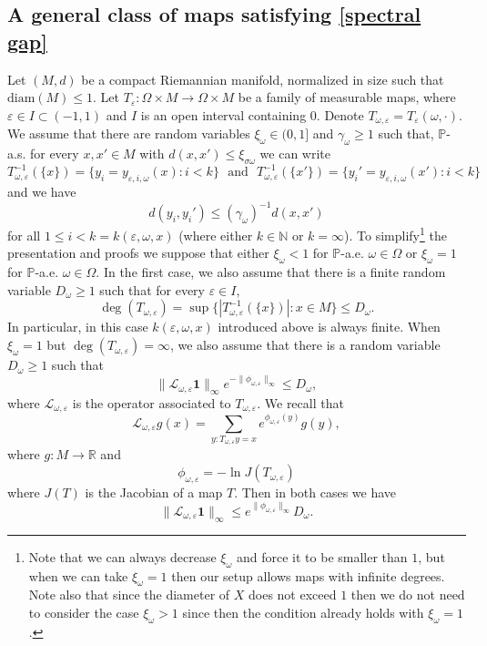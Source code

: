 \documentclass[11pt,reqno,a4paper]{article}
\theoremstyle{special}
\def\N{\mathbb{N}}
\def\om{\omega}
\begin{document}
\subsection{A general class of maps satisfying \eqref{spectral gap}}\label{3.1}
Let $(M,d)$ be a compact Riemannian manifold, normalized in size such that $\text{diam}(M)\leq 1$. Let $T_\varepsilon:\Omega\times M\to \Omega\times M$ be  a family of measurable maps, where $\varepsilon\in I\subset (-1,1)$ and $I$  is an open interval containing $0$. Denote $T_{\omega, \varepsilon}=T_\varepsilon(\omega,\cdot)$. We assume that 
 there are random variables $\xi_\omega \in(0,1]$ and
$\gamma_\omega\geq 1$  such that, $\mathbb P$-a.s.
for every $x,x'\in M$ with $d(x,x')\leq \xi_{\sigma\omega}$ we can write 
\begin{equation}\label{Pair1.0}
T_{\omega, \varepsilon}^{-1}(\{x\})=\{y_i=y_{\varepsilon,i,\omega}(x): i<k\}\,\,\text{ and }\,\,T_{\omega, \varepsilon}^{-1}(\{x'\})=\{y_i'=y_{\varepsilon,i,\omega}(x'): i<k\}
\end{equation}
and we have
\begin{equation}\label{Pair2.0}
d(y_i,y_i')\leq (\gamma_\omega)^{-1}d(x,x')
\end{equation}
for all  $1\leq i<k=k(\varepsilon,\omega,x)$ (where either $k\in\N$ or $k=\infty$). To simplify\footnote{Note that we can always decrease $\xi_\omega$ and force it to be smaller than $1$, but when we can take $\xi_\omega=1$ then our setup allows maps with infinite degrees. Note also that since the diameter of $X$ does not exceed $1$ then we do not need to consider the case $\xi_\om>1$ since then the condition already holds with $\xi_\om=1$.} the presentation and proofs we suppose that either $\xi_\omega<1$ for $\mathbb P$-a.e. $\omega \in \Omega$ or $\xi_\omega=1$ for $\mathbb P$-a.e.  $\omega\in \Omega$. 
In the first case,  we also assume that there is a finite random variable $D_\omega\geq 1$ such that for every $\varepsilon\in I$,
\begin{equation}\label{Domega}
\deg (T_{\omega, \varepsilon})=\sup\{|T_{\omega, \varepsilon}^{-1}(\{x\})|: x\in M\}\leq D_\omega.
\end{equation}
In particular, in this case $k(\varepsilon,\omega,x)$ introduced above is always finite. When $\xi_{\omega}=1$ but $\deg (T_{\omega, \varepsilon})=\infty$,  we also assume that there is a random variable $D_\omega\geq 1$ such that 
\[\|\mathcal L_{\omega, \varepsilon} \textbf{1}\|_\infty e^{-\|\phi_{\omega, \varepsilon}\|_\infty}
\leq D_\omega, \] where $\mathcal L_{\omega, \varepsilon}$ is the operator associated to $T_{\omega, \varepsilon}$. We recall that 
\[\mathcal L_{\omega, \varepsilon} g(x)=\sum_{y: T_{\omega, \varepsilon} y=x}e^{\phi_{\omega, \varepsilon}(y)}g(y),\] where $g\colon M\to\mathbb R$ and
$$
\phi_{\omega, \varepsilon}=-\ln J(T_{\omega, \varepsilon})
$$
where $J(T)$ is the Jacobian of a map $T$.
Then in both cases we have  
\begin{equation}\label{D need}
 \|\mathcal L_{\omega, \varepsilon} \textbf{1}\|_\infty\leq e^{\|\phi_{\omega, \varepsilon}\|_\infty}D_\omega. 
\end{equation}
\end{document}
